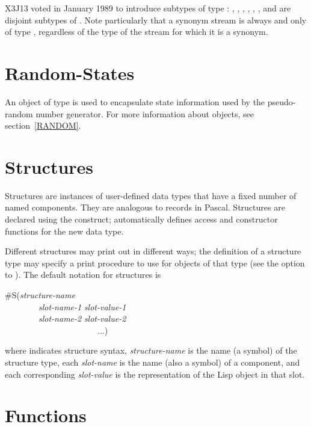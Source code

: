 {\begin{newer}
X3J13 voted in January 1989
to introduce subtypes of type :
, ,
, , , ,
and  are disjoint subtypes of .
Note particularly that a synonym stream is always and only of type
, regardless of the type of the stream for which it is a synonym.
\end{newer}

\section{Random-States}

An object of type  is used to encapsulate
state information used by the pseudo-random number generator.
For more information about  objects,
see section~\ref{RANDOM}.

\section{Structures}

Structures are instances of user-defined data types that have
a fixed number of named components.  They are analogous to
records in Pascal.
Structures are declared using the  construct;
 automatically defines access and constructor functions for
the new data type.

Different structures may print out in different ways;
the definition of a structure type may specify a print procedure
to use for objects of that type (see the
 option to ).
The default notation for structures is
\begin{lisp}
\#S({\it structure-name} \\
~~~~~~~~{\it slot-name-1} {\it slot-value-1} \\
~~~~~~~~{\it slot-name-2} {\it slot-value-2} \\
~~~~~~~~~~~~~~~~~~~~~~...)
\end{lisp}
where  indicates structure syntax, {\it structure-name} is
the name (a symbol) of the structure type, each {\it slot-name} is the name
(also a symbol) of a component, and each corresponding {\it slot-value}
is the representation of the Lisp object in that slot.

\section{Functions}
\label{FUNCTION-TYPE-SECTION}

}
